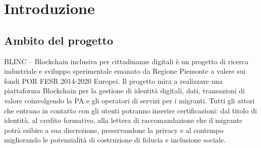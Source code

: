 \chapter{Introduzione}

\section{Ambito del progetto}
BLINC – Blockchain inclusiva per cittadinanze digitali è un progetto di ricerca industriale e sviluppo sperimentale emanato da Regione Piemonte a valere sui fondi POR FESR 2014-2020 Europei. Il progetto mira a realizzare una piattaforma Blockchain per la gestione di identità digitali, dati, transazioni di valore coinvolgendo la PA e gli operatori di servizi per i migranti. Tutti gli attori che entrano in contatto con gli utenti potranno inserire certificazioni: dal titolo di identità, al credito formativo, alla lettera di raccomandazione che il migrante potrà esibire a sua discrezione, preservandone la privacy e al contempo migliorando le potenzialità di costruzione di fiducia e inclusione sociale.

